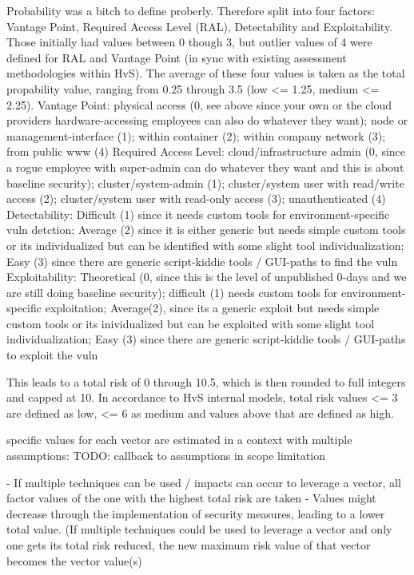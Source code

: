 Probability was a bitch to define proberly. Therefore split into four factors: Vantage Point, Required Access Level (RAL), Detectability and Exploitability. Those initially had values between 0 though 3, but outlier values of 4  were defined for RAL and Vantage Point (in sync with existing assessment methodologies within HvS).
The average of these four values is taken as the total propability value, ranging from 0.25 through 3.5 (low <= 1.25, medium <= 2.25).
Vantage Point: physical access (0, see above since your own or the cloud providers hardware-accessing employees can also do whatever they want); node or management-interface (1); within container (2); within company network (3); from public www (4)
Required Access Level: cloud/infrastructure admin (0, since a rogue employee with super-admin can do whatever they want and this is about baseline security); cluster/system-admin (1); cluster/system user with read/write access (2); cluster/system user with read-only access (3); unauthenticated (4)
Detectability: Difficult (1) since it needs custom tools for environment-specific vuln detction; Average (2) since it is either generic but needs simple custom tools or its individualized but can be identified with some slight tool individualization; Easy (3) since there are generic script-kiddie tools / GUI-paths to find the vuln
Exploitability: Theoretical (0, since this is the level of unpublished 0-days and we are still doing baseline security); difficult (1) needs custom tools for environment-specific exploitation; Average(2), since its a generic exploit but needs simple custom tools or its inividualized but can be exploited with some slight tool individualization; Easy (3) since there are generic script-kiddie tools / GUI-paths to exploit the vuln

This leads to a total risk of 0 through 10.5, which is then rounded to full integers and capped at 10. In accordance to HvS internal models, total risk values <= 3 are defined as low, <= 6 as medium and values above that are defined as high.

specific values for each vector are estimated in a context with multiple assumptions:
TODO: callback to assumptions in scope limitation

- If multiple techniques can be used / impacts can occur to leverage a vector, all factor values of the one with the highest total risk are taken
- Values might decrease through the implementation of security measures, leading to a lower total value. (If multiple techniques could be used to leverage a vector and only one gets its total risk reduced, the new maximum risk value of that vector becomes the vector value(s)

